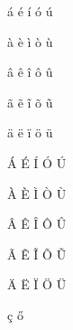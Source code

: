 \documentclass[12pt,a4paper]{article}
\begin{document}
\'a
\'e
\'i
\'o
\'u

\`a
\`e
\`i
\`o
\`u

\^a
\^e
\^i
\^o
\^u

\~a
\~e
\~i
\~o
\~u

\"a
\"e
\"i
\"o
\"u

\'A
\'E
\'I
\'O
\'U

\`A
\`E
\`I
\`O
\`U

\^A
\^E
\^I
\^O
\^U

\~A
\~E
\~I
\~O
\~U

\"A
\"E
\"I
\"O
\"U

\c{c}
\H{o}
\end{document}

